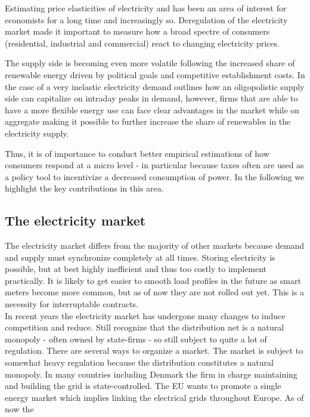 \label{sec:background}
Estimating price elasticities of electricity and has been an area of interest for economists for a long time and increasingly so. Deregulation of the electricity market made it important to measure how a broad spectre of consumers (residential, industrial and commercial) react to changing electricity prices.\par
The supply side is becoming even more volatile following the increased share of renewable energy driven by political goals and competitive establishment costs. In the case of a very inelastic electricity demand \citet{wolak2001impact} outlines how an oligopolistic supply side can capitalize on intraday peaks in demand, however, firms that are able to have a more flexible energy use can face clear advantages in the market while on aggregate making it possible to further increase the share of renewables in the electricity supply. \par
Thus, it is of importance to conduct better empirical estimations of how consumers respond at a micro level - in particular because taxes often are used as a policy tool to incentivize a decreased consumption of power. In the following we highlight the key contributions in this area.

\subsection{The electricity market}
\label{subsec:b_market}
The electricity market differs from the majority of other markets because demand and supply must synchronize completely at all times. Storing electricity is possible, but at best highly inefficient and thus too costly to implement practically. It is likely to get easier to smooth load profiles in the future as smart meters become more common, but as of now they are not rolled out yet. This is a necessity for interruptable contracts. 
\medskip\\
In recent years the electricity market has undergone many changes to induce competition and reduce. Still recognize that the distribution net is a natural monopoly - often owned by state-firms - so still subject to quite a lot of regulation. 
There are several ways to organize a market. The market is subject to somewhat heavy regulation because the distribution constitutes a natural monopoly. In many countries including Denmark the firm in charge maintaining and building the grid is state-controlled.  The EU wants to promote a single energy market which implies linking the electrical grids throughout Europe. As of now the 

